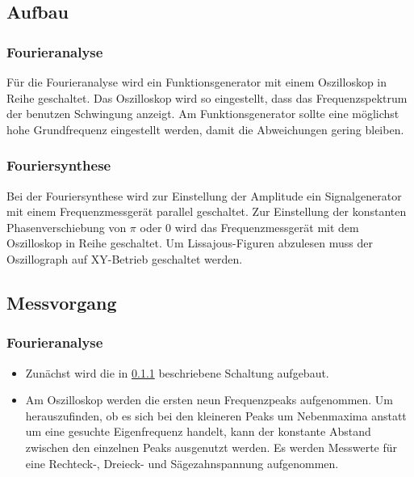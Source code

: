 \subsection{Aufbau}

\subsubsection{Fourieranalyse}
\label{sec:AufbauA}

Für die Fourieranalyse wird ein Funktionsgenerator mit einem Oszilloskop
in Reihe geschaltet. Das Oszilloskop wird so eingestellt, dass das
Frequenzspektrum der benutzen Schwingung anzeigt.
Am Funktionsgenerator sollte eine möglichst hohe Grundfrequenz eingestellt
werden, damit die Abweichungen gering bleiben.

\subsubsection{Fouriersynthese}
\label{sec:AufbauS}

Bei der Fouriersynthese wird zur Einstellung der Amplitude ein
Signalgenerator mit einem Frequenzmessgerät parallel geschaltet. Zur Einstellung
der konstanten Phasenverschiebung von $\pi$ oder 0 wird das Frequenzmessgerät
mit dem Oszilloskop in Reihe geschaltet.
Um Lissajous-Figuren abzulesen muss der Oszillograph auf XY-Betrieb geschaltet
werden.


\subsection{Messvorgang}

\subsubsection{Fourieranalyse}

\begin{itemize}

  \item Zunächst wird die in \ref{sec:AufbauA} beschriebene Schaltung aufgebaut.

  \item Am Oszilloskop werden die ersten neun Frequenzpeaks aufgenommen.
  Um herauszufinden, ob es sich bei den kleineren Peaks um
  Nebenmaxima anstatt um eine gesuchte Eigenfrequenz handelt, kann der
  konstante Abstand zwischen den einzelnen Peaks ausgenutzt werden.
  Es werden Messwerte für eine Rechteck-, Dreieck- und Sägezahnspannung
  aufgenommen.

\end{itemize}

